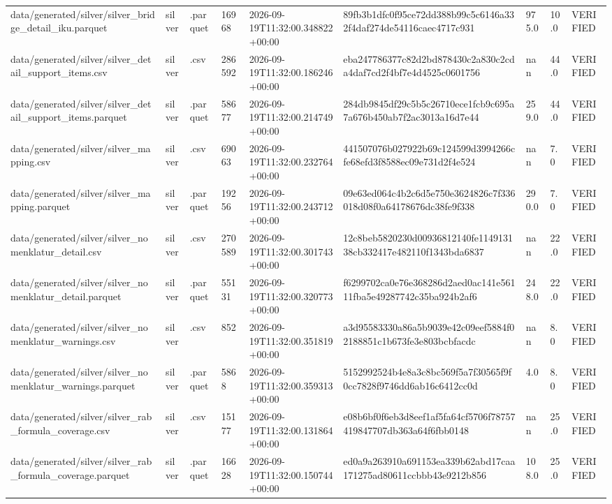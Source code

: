 \begin{longtable}{lllllllll}
data/generated/silver/silver_bridge_detail_iku.parquet & silver & .parquet & 16968 & 2026-09-19T11:32:00.348822+00:00 & 89fb3b1dfc0f95ce72dd388b99c5c6146a332f4daf274de54116caec4717c931 & 975.0 & 10.0 & VERIFIED \\
data/generated/silver/silver_detail_support_items.csv & silver & .csv & 286592 & 2026-09-19T11:32:00.186246+00:00 & eba247786377c82d2bd878430c2a830c2cda4daf7cd2f4bf7e4d4525c0601756 & nan & 44.0 & VERIFIED \\
data/generated/silver/silver_detail_support_items.parquet & silver & .parquet & 58677 & 2026-09-19T11:32:00.214749+00:00 & 284db9845df29c5b5c26710ece1fcb9c695a7a676b450ab7f2ac3013a16d7e44 & 259.0 & 44.0 & VERIFIED \\
data/generated/silver/silver_mapping.csv & silver & .csv & 69063 & 2026-09-19T11:32:00.232764+00:00 & 441507076b027922b69c124599d3994266cfe68efd3f8588ec09e731d2f4e524 & nan & 7.0 & VERIFIED \\
data/generated/silver/silver_mapping.parquet & silver & .parquet & 19256 & 2026-09-19T11:32:00.243712+00:00 & 09e63ed064c4b2c6d5e750e3624826c7f336018d08f0a64178676dc38fe9f338 & 290.0 & 7.0 & VERIFIED \\
data/generated/silver/silver_nomenklatur_detail.csv & silver & .csv & 270589 & 2026-09-19T11:32:00.301743+00:00 & 12c8beb5820230d00936812140fe114913138cb332417e482110f1343bda6837 & nan & 22.0 & VERIFIED \\
data/generated/silver/silver_nomenklatur_detail.parquet & silver & .parquet & 55131 & 2026-09-19T11:32:00.320773+00:00 & f6299702ca0e76e368286d2aed0ac141e56111fba5e49287742c35ba924b2af6 & 248.0 & 22.0 & VERIFIED \\
data/generated/silver/silver_nomenklatur_warnings.csv & silver & .csv & 852 & 2026-09-19T11:32:00.351819+00:00 & a3d95583330a86a5b9039e42c09eef5884f02188851c1b673fe3e803bcbfacdc & nan & 8.0 & VERIFIED \\
data/generated/silver/silver_nomenklatur_warnings.parquet & silver & .parquet & 5868 & 2026-09-19T11:32:00.359313+00:00 & 5152992524b4e8a3c8bc569f5a7f30565f9f0cc7828f9746dd6ab16c6412cc0d & 4.0 & 8.0 & VERIFIED \\
data/generated/silver/silver_rab_formula_coverage.csv & silver & .csv & 15177 & 2026-09-19T11:32:00.131864+00:00 & e08b6bf0f6eb3d8eef1af5fa64cf5706f78757419847707db363a64f6fbb0148 & nan & 25.0 & VERIFIED \\
data/generated/silver/silver_rab_formula_coverage.parquet & silver & .parquet & 16628 & 2026-09-19T11:32:00.150744+00:00 & ed0a9a263910a691153ea339b62abd17caa171275ad80611ccbbb43e9212b856 & 108.0 & 25.0 & VERIFIED \\

\end{longtable}

